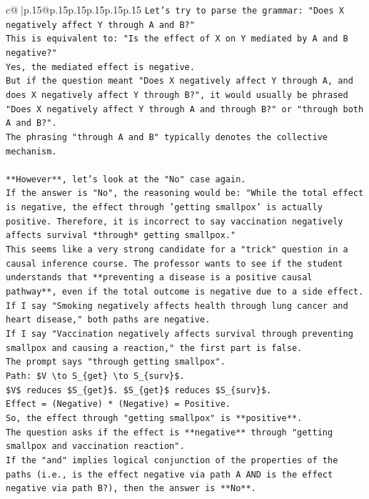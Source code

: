 \documentclass{article}
\begin{document}
{\begin{supertabular}{c@{$\;$}|p{.15\linewidth}@{}p{.15\linewidth}p{.15\linewidth}p{.15\linewidth}p{.15\linewidth}p{.15\linewidth}}
{{{\texttt{Let's try to parse the grammar: "Does X negatively affect Y through A and B?"} \\
\texttt{This is equivalent to: "Is the effect of X on Y mediated by A and B negative?"} \\
\texttt{Yes, the mediated effect is negative.} \\
\texttt{But if the question meant "Does X negatively affect Y through A, and does X negatively affect Y through B?", it would usually be phrased "Does X negatively affect Y through A and through B?" or "through both A and B?".} \\
\texttt{The phrasing "through A and B" typically denotes the collective mechanism.} \\
\\ 
\texttt{**However**, let's look at the "No" case again.} \\
\texttt{If the answer is "No", the reasoning would be: "While the total effect is negative, the effect through 'getting smallpox' is actually positive. Therefore, it is incorrect to say vaccination negatively affects survival *through* getting smallpox."} \\
\texttt{This seems like a very strong candidate for a "trick" question in a causal inference course. The professor wants to see if the student understands that **preventing a disease is a positive causal pathway**, even if the total outcome is negative due to a side effect.} \\
\texttt{If I say "Smoking negatively affects health through lung cancer and heart disease," both paths are negative.} \\
\texttt{If I say "Vaccination negatively affects survival through preventing smallpox and causing a reaction," the first part is false.} \\
\texttt{The prompt says "through getting smallpox".} \\
\texttt{Path: \$V \textbackslash{}to S\_\{get\} \textbackslash{}to S\_\{surv\}\$.} \\
\texttt{\$V\$ reduces \$S\_\{get\}\$. \$S\_\{get\}\$ reduces \$S\_\{surv\}\$.} \\
\texttt{Effect = (Negative) * (Negative) = Positive.} \\
\texttt{So, the effect through "getting smallpox" is **positive**.} \\
\texttt{The question asks if the effect is **negative** through "getting smallpox and vaccination reaction".} \\
\texttt{If the "and" implies logical conjunction of the properties of the paths (i.e., is the effect negative via path A AND is the effect negative via path B?), then the answer is **No**.} \\
}}}
\end{supertabular}}
\end{document}
